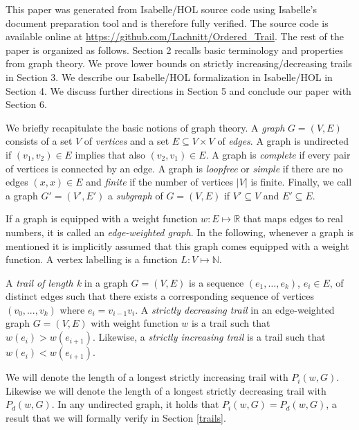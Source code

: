 \begin{isabellebody}
\begin{isamarkuptext}
This paper was generated from Isabelle/HOL source code using Isabelle's document preparation tool 
and is therefore fully verified. The source code is available
online at \url{https://github.com/Lachnitt/Ordered_Trail}. The rest of the paper is organized as follows.
Section 2 recalls basic terminology and properties from graph theory. 
We prove lower bounds on strictly increasing/decreasing trails in Section 3. We describe our Isabelle/HOL 
formalization in Isabelle/HOL in Section 4. We discuss further directions in Section 5 and conclude our paper with Section 6.%
\end{isamarkuptext}\isamarkuptrue%
%
\isadelimdocument
%
\endisadelimdocument
%
\isatagdocument
%
\isamarkuptrue%
%
\endisatagdocument
{\isafolddocument}%
%
\isadelimdocument
%
\endisadelimdocument
%
\begin{isamarkuptext}%
\label{Prelim}
We briefly recapitulate the basic notions of graph theory. A {\em graph} $G = (V,E)$ consists of
a set $V$ of {\em vertices} and a set $E \subseteq V \times V$ of {\em edges}. A graph is undirected 
if $(v_1,v_2)\in E$ implies that also $(v_2,v_1)\in E$. A graph is {\em complete}
 if every pair of vertices is connected by an edge. A graph is {\em loopfree} or {\em simple} if there are no edges $(x,x)\in E$ and 
{\em finite} if the number of vertices $|V|$ is finite. Finally, we call 
a graph $G'=(V',E')$ a {\em subgraph} of $G = (V,E) $ if $V' \subseteq V$ and $E' \subseteq E$.

If a graph is equipped with a
 weight function $w: E \mapsto \mathbb{R}$ that maps edges to real numbers, it is called 
 an {\em edge-weighted graph}. In the following, whenever a graph is mentioned it is implicitly assumed
that this graph comes equipped with a weight function. A vertex labelling is a function $L: V \mapsto \mathbb{N}$.

A {\em trail of length k} in a graph $G = (V,E)$ is a sequence $(e_1,\ldots,e_k)$, $e_i \in E$, of distinct edges such that
 there exists a corresponding sequence of vertices $(v_0,...,v_k)$ where $e_i = v_{i-1}v_i$. 
A {\em strictly decreasing trail} in an edge-weighted graph $G = (V,E)$ with weight function $w$
is a trail such that $w (e_i) > w (e_{i+1})$. Likewise, a {\em strictly increasing trail} is a trail such that $w (e_i) < w (e_{i+1})$.

We will denote the length of a longest strictly increasing trail with $P_i(w,G)$. Likewise we will denote the length
of a longest strictly decreasing trail with $P_d(w,G)$. In any undirected graph, it holds that $P_i(w,G) = P_d(w,G)$, 
a result that we will formally verify in Section \ref{trails}. 


\end{isamarkuptext}
\end{isabellebody}
